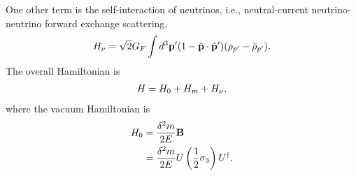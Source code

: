 \documentclass[letterpaper,12pt,english]{sphinxmanual}
\begin{document}
One other term is the self-interaction of neutrinos, i.e., neutral-current neutrino-neutrino forward exchange scattering,
\begin{gather}
\begin{split}H_\nu =\sqrt{2}G_F \int d^3\mathbf p' (1-\hat {\mathbf p}\cdot \hat{\mathbf p}')(\rho_{p'}-\bar \rho_{p'}).\end{split}\notag
\end{gather}
The overall Hamiltonian is
\begin{gather}
\begin{split}H = H_0 + H_m + H_\nu ,\end{split}\notag
\end{gather}
where the vacuum Hamiltonian is
\begin{gather}
\begin{split}H_0 &= \frac{\delta^2 m}{2E} \mathbf B \\
& = \frac{\delta^2 m}{2E} U \left(\frac{1}{2}\sigma_3 \right) U^\dagger .\end{split}\notag
\end{gather}
\end{document}
